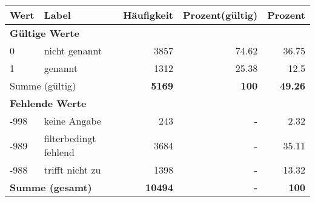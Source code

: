      \begin{longtable}{lXrrr}
     \toprule
     \textbf{Wert} & \textbf{Label} & \textbf{Häufigkeit} & \textbf{Prozent(gültig)} & \textbf{Prozent} \\
     \endhead
     \midrule
     \multicolumn{5}{l}{\textbf{Gültige Werte}}\\

     0 &
     \multicolumn{1}{X}{ nicht genannt   } &


       \num{3857} &
       \num[round-mode=places,round-precision=2]{74,62} &
         \num[round-mode=places,round-precision=2]{36,75} \\

     1 &
     \multicolumn{1}{X}{ genannt   } &


       \num{1312} &
       \num[round-mode=places,round-precision=2]{25,38} &
         \num[round-mode=places,round-precision=2]{12,5} \\
     \midrule
     \multicolumn{2}{l}{Summe (gültig)} &
       \textbf{\num{5169}} &
     \textbf{100} &
       \textbf{\num[round-mode=places,round-precision=2]{49,26}} \\
     \multicolumn{5}{l}{\textbf{Fehlende Werte}}\\
       -998 &
       keine Angabe &
         \num{243} &
        - &
         \num[round-mode=places,round-precision=2]{2,32} \\
       -989 &
       filterbedingt fehlend &
         \num{3684} &
        - &
         \num[round-mode=places,round-precision=2]{35,11} \\
       -988 &
       trifft nicht zu &
         \num{1398} &
        - &
         \num[round-mode=places,round-precision=2]{13,32} \\
     \midrule
     \multicolumn{2}{l}{\textbf{Summe (gesamt)}} &
          \textbf{\num{10494}} &
        \textbf{-} &
        \textbf{100} \\
     \bottomrule
     \end{longtable}
     
